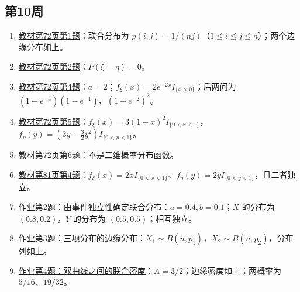 \subsection*{第10周}
\begin{enumerate}
\item \hyperref[ex:w10-b72-1]{教材第72页第1题}：联合分布为 $p(i,j)=1/(nj)$（$1\leq i\leq j\leq n$）；两个边缘分布如上。
\item \hyperref[ex:w10-b72-2]{教材第72页第2题}：$P(\xi=\eta)=0$。
\item \hyperref[ex:w10-b72-4]{教材第72页第4题}：$a=2$；$f_\xi(x)=2e^{-2x}I_{\{x>0\}}$；后两问为 $(1-e^{-4})(1-e^{-1})$、$(1-e^{-2})^2$。
\item \hyperref[ex:w10-b72-5]{教材第72页第5题}：$f_\xi(x)=3(1-x)^2I_{\{0<x<1\}}$，$f_\eta(y)=(3y-\frac32y^2)I_{\{0<y<1\}}$。
\item \hyperref[ex:w10-b72-6]{教材第72页第6题}：不是二维概率分布函数。
\item \hyperref[ex:w10-b81-4]{教材第81页第4题}：$f_\xi(x)=2xI_{\{0<x<1\}}$、$f_\eta(y)=2yI_{\{0<y<1\}}$，且二者独立。
\item \hyperref[ex:w10-h2]{作业第2题：由事件独立性确定联合分布}：$a=0.4,b=0.1$；$X$ 的分布为 $(0.8,0.2)$，$Y$ 的分布为 $(0.5,0.5)$；相互独立。
\item \hyperref[ex:w10-h3]{作业第3题：三项分布的边缘分布}：$X_1\sim B(n,p_1)$，$X_2\sim B(n,p_2)$，分布列如上。
\item \hyperref[ex:w10-h4]{作业第4题：双曲线之间的联合密度}：$A=3/2$；边缘密度如上；两概率为 $5/16$、$19/32$。
\end{enumerate}
